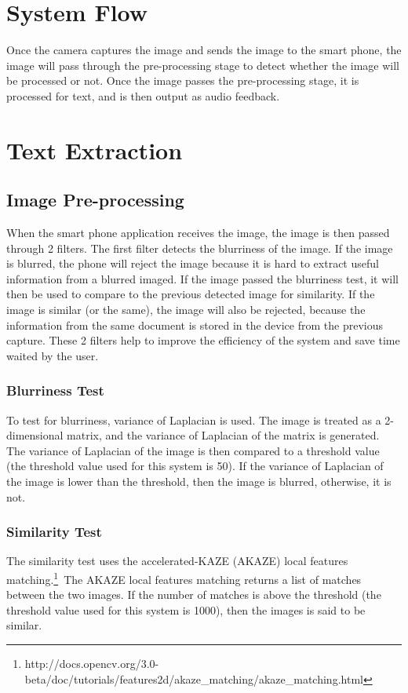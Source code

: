 \section{System Flow}
Once the camera captures the image and sends the image to the smart phone, the image will pass through the pre-processing stage to detect whether the image will be processed or not. Once the image passes the pre-processing stage, it is processed for text, and is then output as audio feedback.

\section{Text Extraction}

\subsection{Image Pre-processing}
When the smart phone application receives the image, the image is then passed through 2 filters. The first filter detects the blurriness of the image. If the image is blurred, the phone will reject the image because it is hard to extract useful information from a blurred imaged. If the image passed the blurriness test, it will then be used to compare to the previous detected image for similarity. If the image is similar (or the same), the image will also be rejected, because the information from the same document is stored in the device from the previous capture. These 2 filters help to improve the efficiency of the system and save time waited by the user.

\subsubsection{Blurriness Test}
To test for blurriness, variance of Laplacian is used. The image is treated as a 2-dimensional matrix, and the variance of Laplacian of the matrix is generated. The variance of Laplacian of the image is then compared to a threshold value (the threshold value used for this system is 50). If the variance of Laplacian of the image is lower than the threshold, then the image is blurred, otherwise, it is not.

\subsubsection{Similarity Test}
The similarity test uses the accelerated-KAZE (AKAZE) local features matching.\footnote{http://docs.opencv.org/3.0-beta/doc/tutorials/features2d/akaze\_matching/akaze\_matching.html}~The AKAZE local features matching returns a list of matches between the two images. If the number of matches is above the threshold (the threshold value used for this system is 1000), then the images is said to be similar.

